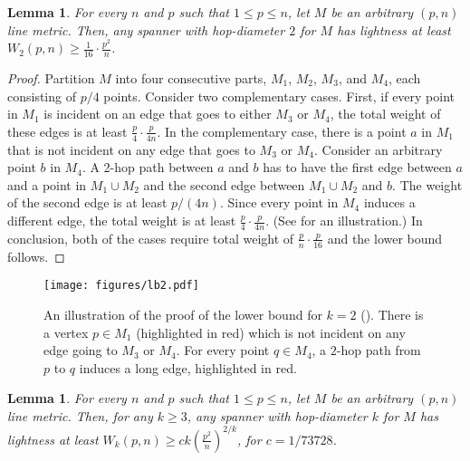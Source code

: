 \documentclass[11pt,english]{article}
\newtheorem{lemma}[theorem]{Lemma}
\begin{document}
\begin{lemma}\label{st:lb-2}
For every $n$ and $p$ such that $1 \le p \le n$, let $M$ be an arbitrary $(p,n)$ line metric. Then, any spanner with hop-diameter $2$ for $M$ has lightness at least $W_2(p,n) \ge \frac{1}{16}\cdot \frac{p^2}{n}$.
\end{lemma}
\begin{proof}
Partition $M$ into four consecutive parts, $M_1$, $M_2$, $M_3$, and $M_4$, each consisting of $p/4$ points. Consider two complementary cases. First, if every point in $M_1$ is incident on an edge that goes to either $M_3$ or $M_4$, the total weight of these edges is at least $\frac{p}{4}\cdot \frac{p}{4n}$. In the complementary case, there is a point $a$ in $M_1$ that is not incident on any edge that goes to $M_3$ or $M_4$. Consider an arbitrary point $b$ in $M_4$. A 2-hop path between $a$ and $b$ has to have the first edge between $a$ and a point in $M_1 \cup M_2$ and the second edge between $M_1 \cup M_2$ and $b$. The weight of the second edge is at least $p/(4n)$. Since every point in $M_4$ induces a different edge, the total weight is at least $\frac{p}{4}\cdot \frac{p}{4n}$. (See  for an illustration.) In conclusion, both of the cases require total weight of $\frac{p}{n}\cdot\frac{p}{16}$ and the lower bound follows.
\end{proof}
\begin{figure}        
\texttt{[image: figures/lb2.pdf]}
\caption{An illustration of the proof of the lower bound for $k=2$ (). There is a vertex $p \in M_1$ (highlighted in red) which is not incident on any edge going to $M_3$ or $M_4$. For every point $q \in M_4$, a $2$-hop path from $p$ to $q$ induces a long edge, highlighted in red.}\label{fig:lb-2}
\end{figure}
\begin{lemma}\label{st:lb-k}
For every $n$ and $p$ such that $1 \le p \le n$, let $M$ be an arbitrary $(p,n)$ line metric. Then, for any $k\ge 3$, any spanner with hop-diameter $k$ for $M$ has lightness at least $W_k(p,n) \ge ck\left(\frac{p^2}{n}\right)^{2/k}$, for $c = 1/73728$.
\end{lemma}
\end{document}
